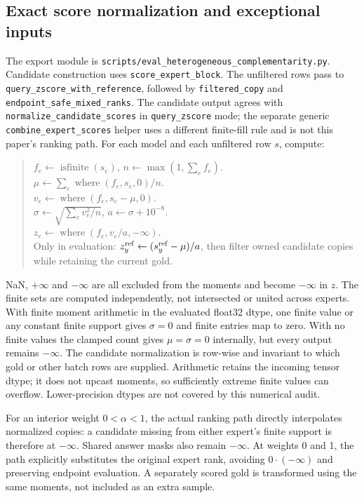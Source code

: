 \documentclass[11pt,a4paper]{article}
\begin{document}
\subsection{Exact score normalization and exceptional inputs}
\label{app:normalization}
The export module is \texttt{scripts/\allowbreak eval\_\allowbreak heterogeneous\_\allowbreak complementarity.py}. Candidate construction uses \texttt{score\_expert\_block}. The unfiltered rows pass to \texttt{query\_zscore\_with\_reference}, followed by \texttt{filtered\_copy} and \texttt{endpoint\_safe\_mixed\_ranks}. The candidate output agrees with \texttt{normalize\_candidate\_scores} in \texttt{query\_zscore} mode; the separate generic \texttt{combine\_expert\_scores} helper uses a different finite-fill rule and is not this paper's ranking path.
For each model and each unfiltered row $s$, compute:
\begin{quote}\small
$f_e\leftarrow\operatorname{isfinite}(s_e)$, $n\leftarrow\max(1,\sum_e f_e)$.\\
$\mu\leftarrow\sum_e\operatorname{where}(f_e,s_e,0)/n$.\\
$v_e\leftarrow\operatorname{where}(f_e,s_e-\mu,0)$.\\
$\sigma\leftarrow\sqrt{\sum_e v_e^2/n}$, $a\leftarrow\sigma+10^{-8}$.\\
$z_e\leftarrow\operatorname{where}(f_e,v_e/a,-\infty)$.\\
Only in evaluation: $z_y^{\rm ref}\leftarrow(s_y^{\rm ref}-\mu)/a$, then filter owned candidate copies while retaining the current gold.
\end{quote}
NaN, $+\infty$ and $-\infty$ are all excluded from the moments and become $-\infty$ in $z$. The finite sets are computed independently, not intersected or united across experts. With finite moment arithmetic in the evaluated float32 dtype, one finite value or any constant finite support gives $\sigma=0$ and finite entries map to zero. With no finite values the clamped count gives $\mu=\sigma=0$ internally, but every output remains $-\infty$. The candidate normalization is row-wise and invariant to which gold or other batch rows are supplied. Arithmetic retains the incoming tensor dtype; it does not upcast moments, so sufficiently extreme finite values can overflow. Lower-precision dtypes are not covered by this numerical audit.

For an interior weight $0<\alpha<1$, the actual ranking path directly interpolates normalized copies: a candidate missing from either expert's finite support is therefore at $-\infty$. Shared answer masks also remain $-\infty$. At weights 0 and 1, the path explicitly substitutes the original expert rank, avoiding $0\cdot(-\infty)$ and preserving endpoint evaluation. A separately scored gold is transformed using the same moments, not included as an extra sample.
\end{document}
